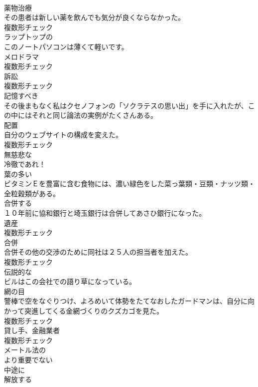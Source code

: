\documentclass[8pt]{extreport}
\begin{document}
\begin{CJK}{UTF8}{min}
\\	[名詞]	薬物治療	
\\	その患者は新しい薬を飲んでも気分が良くならなかった。	
\\	複数形チェック
\\	[形容詞]	ラップトップの	
\\	このノートパソコンは薄くて軽いです。	
\\	[名詞]	メロドラマ	
\\	複数形チェック
\\	[名詞]	訴訟	
\\	複数形チェック
\\	[形容詞]	記憶すべき	
\\	その後まもなく私はクセノフォンの「ソクラテスの思い出」を手に入れたが、この中にはそれと同じ論法の実例がたくさんある。	
\\	[名詞]	配置	
\\	自分のウェブサイトの構成を変えた。	
\\	複数形チェック
\\	[形容詞]	無慈悲な	
\\	冷徹であれ！	
\\	[形容詞]	葉の多い	
\\	ビタミンＥを豊富に含む食物には、濃い緑色をした菜っ葉類・豆類・ナッツ類・全粒穀類がある。	
\\	[動詞]	合併する	
\\	１０年前に協和銀行と埼玉銀行は合併してあさひ銀行になった。	
\\	[名詞]	遺産	
\\	複数形チェック
\\	[名詞]	合併	
\\	合併その他の交渉のために同社は２５人の担当者を加えた。	
\\	複数形チェック
\\	[形容詞]	伝説的な	
\\	ビルはこの会社での語り草になっている。	
\\	[名詞]	網の目	
\\	警棒で空をなぐりつけ、よろめいて体勢をたてなおしたガードマンは、自分に向かって突進してくる金網づくりのクズカゴを見た。	
\\	複数形チェック
\\	[名詞]	貸し手、金融業者	
\\	複数形チェック
\\	[形容詞]	メートル法の	
\\	[形容詞]	より重要でない	
\\	[形容詞]	中途に	
\\	[動詞]	解放する	

\end{CJK}
\end{document}
